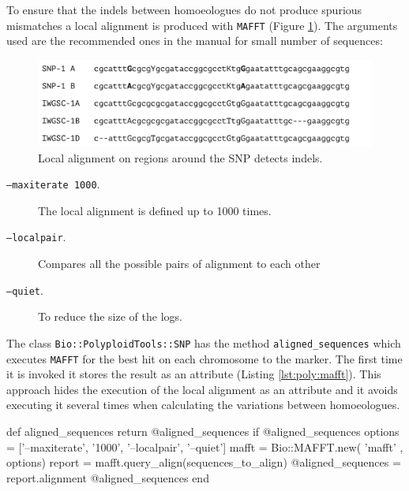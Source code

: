 To ensure that the \acrshort{indels} between homoeologues do not produce spurious mismatches a local alignment is produced with \verb|MAFFT| (Figure \ref{fig:poly:localSequence}). 
The arguments used are the recommended ones in the manual for small number of sequences:

\begin{figure}
\includegraphics[width=1\textwidth]{PolyMarker/Figures/aln/localAlignment.pdf}
\caption{Local alignment on regions around the SNP detects \acrshort{indels}.}
\label{fig:poly:localSequence}
\end{figure}

\begin{description}
\item[\texttt{--maxiterate 1000}.] The local alignment is defined up to 1000 times.
\item[\texttt{--localpair}.] Compares all the possible pairs of alignment to each other
\item[\texttt{--quiet}.] To reduce the size of the logs.  
\end{description}

The class \verb|Bio::PolyploidTools::SNP| has the method \verb|aligned_sequences| which executes \verb|MAFFT| for the best hit on each chromosome to the marker. 
The first time it is invoked it stores the result as an attribute (Listing \ref{lst:poly:mafft}).
This approach hides the execution of the local alignment as an attribute and it avoids executing it several times when calculating the variations between homoeologues. 

\begin{code}[language=Ruby,caption={[\texttt{Bio::PolyploidTools::SNP.aligned\_sequences}]Method in \texttt{Bio::PolyploidTools::SNP} that calculates the local alignment}, label=lst:poly:mafft]
def aligned_sequences
  return @aligned_sequences if @aligned_sequences
  options = ['--maxiterate', '1000', '--localpair', '--quiet']
  mafft = Bio::MAFFT.new( 'mafft' , options)
  report = mafft.query_align(sequences_to_align)
  @aligned_sequences = report.alignment
  @aligned_sequences
end
\end{code}


